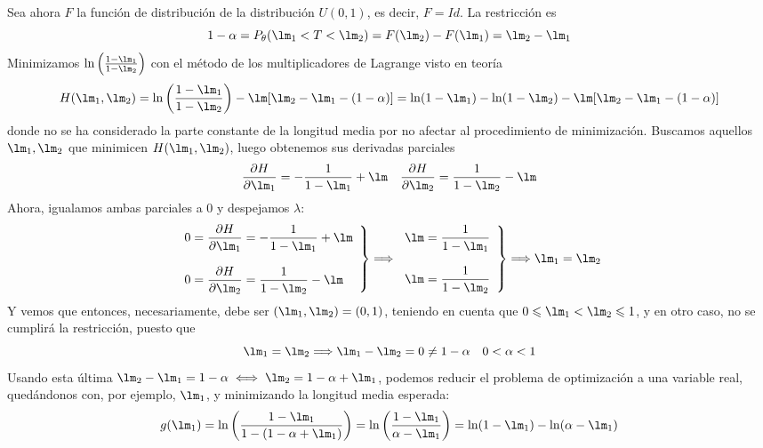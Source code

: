 \documentclass[12pt]{article}
\begin{document}
\begin{ejercicio}[2,25 puntos]
\begin{enumerate}
            Sea ahora $F$ la función de distribución de la distribución $U(0,1)$, es decir, $F = Id$. La restricción es 
            $$1 - \alpha = P_\theta(\lm_1 < T < \lm_2) = F(\lm_2) - F(\lm_1) = \lm_2 - \lm_1$$
            Minimizamos $\ln \left( \frac{1-\lm_1}{1-\lm_2} \right)$ con el método de los multiplicadores de Lagrange visto en teoría
            $$H(\lm_1, \lm_2) = \ln \left( \dfrac{1-\lm_1}{1-\lm_2} \right) - \lm[\lm_2 - \lm_1 - (1-\alpha)] = \ln(1-\lm_1) - \ln(1-\lm_2) - \lm[\lm_2 - \lm_1 - (1-\alpha)]$$
            donde no se ha considerado la parte constante de la longitud media por no afectar al procedimiento de minimización. 
            Buscamos aquellos $\lm_1, \lm_2$ que minimicen $H(\lm_1, \lm_2)$, luego obtenemos sus derivadas parciales
            $$\dfrac{\partial H}{\partial \lm_1} = -\dfrac{1}{1-\lm_1} + \lm \quad 
            \dfrac{\partial H}{\partial \lm_2} = \dfrac{1}{1-\lm_2} - \lm$$
            Ahora, igualamos ambas parciales a $0$ y despejamos $\lambda$:
            \begin{equation*}
                \left.\begin{array}{l}
                    0 = \dfrac{\partial H}{\partial \lm_1} = -\dfrac{1}{1-\lm_1} + \lm \\\\
                    0 = \dfrac{\partial H}{\partial \lm_2} = \dfrac{1}{1-\lm_2} - \lm
                \end{array}\right\} \Longrightarrow \left.\begin{array}{l}
                    \lm = \dfrac{1}{1-\lm_1} \\\\
                    \lm = \dfrac{1}{1-\lm_2}
                \end{array}\right\} \Longrightarrow \lm_1 = \lm_2
            \end{equation*}
            Y vemos que entonces, necesariamente, debe ser $(\lm_1, \lm_2) = (0,1)$, teniendo en cuenta que $0 \leqslant \lm_1 < \lm_2 \leqslant 1$, y en otro caso, no se cumplirá la restricción, puesto que 
            $$\lm_1 = \lm_2 \Longrightarrow \lm_1 - \lm_2 = 0 \neq 1 - \alpha \quad 0 < \alpha < 1$$
            Usando esta última $\lm_2 - \lm_1 = 1 - \alpha \iff \lm_2 = 1 - \alpha + \lm_1$, podemos reducir el problema de optimización a una variable real, quedándonos con, por ejemplo, $\lm_1$, y minimizando la longitud media esperada:
            $$g(\lm_1) = \ln \left( \frac{1-\lm_1}{1-(1 - \alpha + \lm_1)} \right) = \ln \left( \frac{1-\lm_1}{\alpha - \lm_1} \right) = \ln(1-\lm_1) - \ln(\alpha-\lm_1)$$ 

\end{enumerate}
\end{ejercicio}
\end{document}
